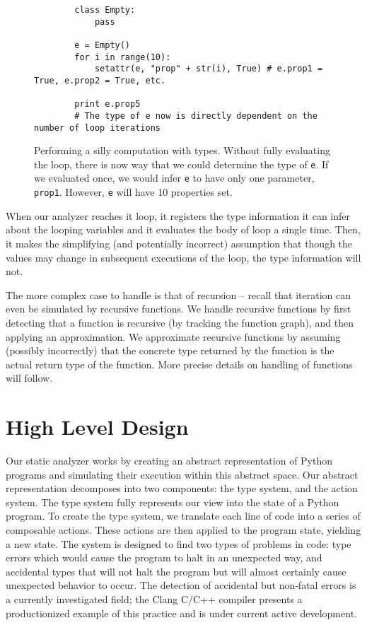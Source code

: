 \documentclass{article}[12pt]
\begin{document}
\begin{figure}
    \begin{verbatim}
        class Empty:
            pass

        e = Empty()
        for i in range(10):
            setattr(e, "prop" + str(i), True) # e.prop1 = True, e.prop2 = True, etc.

        print e.prop5
        # The type of e now is directly dependent on the number of loop iterations
    \end{verbatim}
    \caption{Performing a silly computation with types. Without fully evaluating the loop, there is now
        way that we could determine the type of \texttt{e}. If we evaluated once, we would infer
        \texttt{e} to have only one parameter, \texttt{prop1}. However, \texttt{e} will have 10
        properties set.  
     } 
     \label{fig:cantignoreloops}
 \end{figure}
When our analyzer reaches it loop, it registers the type information it can infer about the looping
variables and it evaluates the body of loop a single time. Then, it makes the simplifying (and
potentially incorrect) assumption that though the values may change in subsequent executions of the
loop, the type information will not.

The more complex case to handle is that of recursion -- recall that iteration can even be simulated
by recursive functions. We handle recursive functions by first detecting that a function is
recursive (by tracking the function graph), and then applying an approximation. We approximate
recursive functions by assuming (possibly incorrectly) that the concrete type returned by the
function is the actual return type of the function. More precise details on handling of functions
will follow.

\section{High Level Design} Our static analyzer works by creating an abstract representation of
Python programs and simulating their execution within this abstract space. Our abstract
representation decomposes into two components: the type system, and the action system. The type
system fully represents our view into the state of a Python program. To create the type system, we
translate each line of code into a series of composable actions.  These actions are then applied to
the program state, yielding a new state. The system is designed to find two types of problems in
code: type errors which would cause the program to halt in an unexpected way, and accidental types
that will not halt the program but will almost certainly cause unexpected behavior to occur. The
detection of accidental but non-fatal errors is a currently investigated field; the Clang C/C++
compiler presents a productionized example of this practice and is under current active development.
\end{document}
